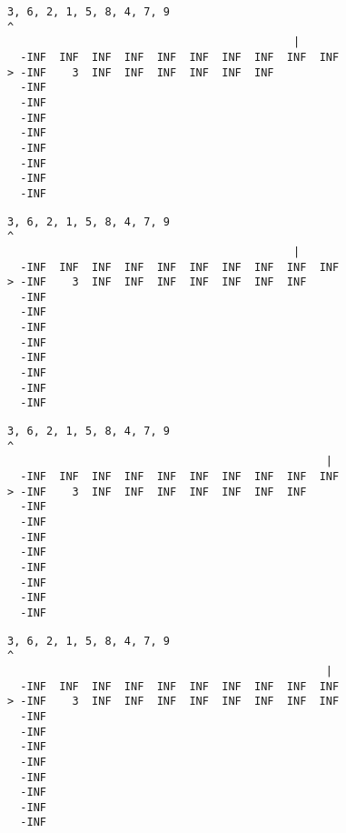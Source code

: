 { \begin{verbatim}
3, 6, 2, 1, 5, 8, 4, 7, 9
^
                                            |
  -INF  INF  INF  INF  INF  INF  INF  INF  INF  INF
> -INF    3  INF  INF  INF  INF  INF  INF          
  -INF                                             
  -INF                                             
  -INF                                             
  -INF                                             
  -INF                                             
  -INF                                             
  -INF                                             
  -INF                                             
\end{verbatim} }

{ \begin{verbatim}
3, 6, 2, 1, 5, 8, 4, 7, 9
^
                                            |
  -INF  INF  INF  INF  INF  INF  INF  INF  INF  INF
> -INF    3  INF  INF  INF  INF  INF  INF  INF     
  -INF                                             
  -INF                                             
  -INF                                             
  -INF                                             
  -INF                                             
  -INF                                             
  -INF                                             
  -INF                                             
\end{verbatim} }

{ \begin{verbatim}
3, 6, 2, 1, 5, 8, 4, 7, 9
^
                                                 |
  -INF  INF  INF  INF  INF  INF  INF  INF  INF  INF
> -INF    3  INF  INF  INF  INF  INF  INF  INF     
  -INF                                             
  -INF                                             
  -INF                                             
  -INF                                             
  -INF                                             
  -INF                                             
  -INF                                             
  -INF                                             
\end{verbatim} }

{ \begin{verbatim}
3, 6, 2, 1, 5, 8, 4, 7, 9
^
                                                 |
  -INF  INF  INF  INF  INF  INF  INF  INF  INF  INF
> -INF    3  INF  INF  INF  INF  INF  INF  INF  INF
  -INF                                             
  -INF                                             
  -INF                                             
  -INF                                             
  -INF                                             
  -INF                                             
  -INF                                             
  -INF                                             
\end{verbatim} }

